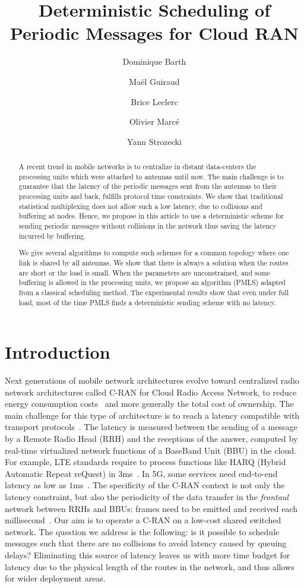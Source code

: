\documentclass[a4paper,10pt]{IEEEtran}
\title{Deterministic Scheduling of Periodic Messages for Cloud RAN}
\author[1]{Dominique Barth}
\author[1,2]{Ma\"el Guiraud}
\author[2]{Brice Leclerc}
\author[2]{Olivier Marc\'e}
\author[1]{Yann Strozecki}
\affil[1]{David Laboratory, UVSQ}
\affil[2]{Nokia Bell Labs France}
\begin{document}
\maketitle

\begin{abstract}
A recent trend in mobile networks is to centralize in distant data-centers the processing units which were attached to 
antennas until now. The main challenge is to guarantee that the latency of the periodic messages sent from the antennas to their processing
units and back, fulfills protocol time constraints. We show that traditional statistical multiplexing does not allow such a low latency, due to collisions and buffering at nodes. Hence, we propose in this article to use a deterministic scheme for sending periodic messages without collisions in the network thus saving the latency incurred by buffering.

We give several algorithms to compute such schemes for a common topology where one link is shared by all antennas.
We show that there is always a solution when the routes are short or the load is small. When the parameters are unconstrained,
and some buffering is allowed in the processing units, we propose an algorithm (PMLS) adapted from a classical scheduling method.
The experimental results show that even under full load, most of the time PMLS finds a deterministic sending scheme with no latency.
\end{abstract}


\section{Introduction}

Next generations of mobile network architectures evolve toward centralized radio network architectures called C-RAN for Cloud Radio Access Network, to reduce energy consumption costs~\cite{mobile2011c} and more generally the total cost of ownership. The main challenge for this type of architecture is to reach a latency compatible with transport protocols~\cite{ieeep802}. The latency is measured between the sending of a message by a Remote Radio Head (RRH) and the receptions of the answer, computed by real-time virtualized network functions of a BaseBand Unit (BBU) in the cloud. For example, LTE standards require to process functions like HARQ (Hybrid Automatic Repeat reQuest) in $3$ms~\cite{bouguen2012lte}. In 5G, some services need end-to-end latency as low as $1$ms~\cite{3gpp5g,boccardi2014five}. The specificity of the C-RAN context is not only the latency constraint, but also the periodicity of the data transfer in the \emph{frontaul} network between RRHs and BBUs: frames need to be emitted and received each millisecond~\cite{bouguen2012lte}.
Our aim is to operate a C-RAN on a low-cost shared switched network.
The question we address is the following: is it possible to schedule messages such that there are no collisions to avoid latency caused by queuing delays? 
Eliminating this source of latency leaves us with more time budget for latency due to the physical length of the routes in the network, and thus allows for wider deployment areas.
\end{document}
